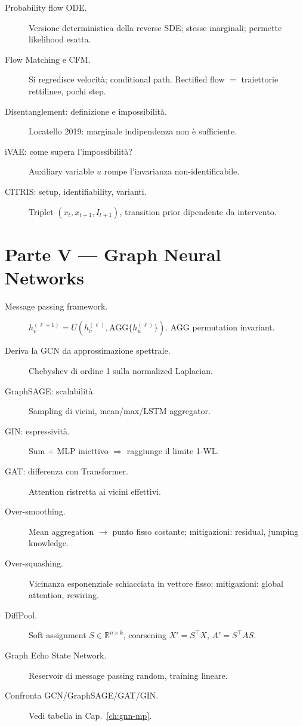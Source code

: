 \begin{description}
  \item[Probability flow ODE.] Versione deterministica della reverse SDE; stesse marginali; permette likelihood esatta.
  \item[Flow Matching e CFM.] Si regredisce velocità; conditional path. Rectified flow $=$ traiettorie rettilinee, pochi step.
  \item[Disentanglement: definizione e impossibilità.] Locatello 2019: marginale indipendenza non è sufficiente.
  \item[iVAE: come supera l'impossibilità?] Auxiliary variable $u$ rompe l'invarianza non-identificabile.
  \item[CITRIS: setup, identifiability, varianti.] Triplet $(x_t, x_{t+1}, I_{t+1})$, transition prior dipendente da intervento.
\end{description}

\section{Parte V — Graph Neural Networks}

\begin{description}
  \item[Message passing framework.] $h_v^{(\ell+1)} = U(h_v^{(\ell)}, \text{AGG}\{h_u^{(\ell)}\})$. AGG permutation invariant.
  \item[Deriva la GCN da approssimazione spettrale.] Chebyshev di ordine 1 sulla normalized Laplacian.
  \item[GraphSAGE: scalabilità.] Sampling di vicini, mean/max/LSTM aggregator.
  \item[GIN: espressività.] Sum + MLP iniettivo $\Rightarrow$ raggiunge il limite 1-WL.
  \item[GAT: differenza con Transformer.] Attention ristretta ai vicini effettivi.
  \item[Over-smoothing.] Mean aggregation $\to$ punto fisso costante; mitigazioni: residual, jumping knowledge.
  \item[Over-squashing.] Vicinanza esponenziale schiacciata in vettore fisso; mitigazioni: global attention, rewiring.
  \item[DiffPool.] Soft assignment $S \in \mathbb{R}^{n\times k}$, coarsening $X' = S^\top X$, $A' = S^\top A S$.
  \item[Graph Echo State Network.] Reservoir di message passing random, training lineare.
  \item[Confronta GCN/GraphSAGE/GAT/GIN.] Vedi tabella in Cap.~\ref{ch:gnn-mp}.
\end{description}

